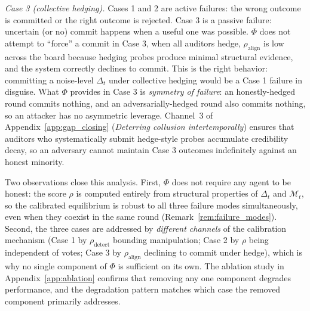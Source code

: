 \emph{Case 3 (collective hedging).} Cases 1 and 2 are active failures: the wrong outcome is committed or the right outcome is rejected. Case 3 is a passive failure: uncertain (or no) commit happens when a useful one was possible. $\Phi$ does not attempt to ``force'' a commit in Case 3, when all auditors hedge, $\rho_{\mathrm{align}}$ is low across the board because hedging probes produce minimal structural evidence, and the system correctly declines to commit. This is the right behavior: committing a noise-level $\Delta_t$ under collective hedging would be a Case 1 failure in disguise. What $\Phi$ provides in Case 3 is \emph{symmetry of failure}: an honestly-hedged round commits nothing, and an adversarially-hedged round also commits nothing, so an attacker has no asymmetric leverage. Channel~3 of Appendix~\ref{app:gap_closing} (\emph{Deterring collusion intertemporally}) ensures that auditors who systematically submit hedge-style probes accumulate credibility decay, so an adversary cannot maintain Case 3 outcomes indefinitely against an honest minority.

Two observations close this analysis. First, $\Phi$ does not require any agent to be honest: the score $\rho$ is computed entirely from structural properties of $\Delta_t$ and $\mathcal{M}_t$, so the calibrated equilibrium is robust to all three failure modes simultaneously, even when they coexist in the same round (Remark~\ref{rem:failure_modes}). Second, the three cases are addressed by \emph{different channels} of the calibration mechanism (Case 1 by $\rho_{\mathrm{detect}}$ bounding manipulation; Case 2 by $\rho$ being independent of votes; Case 3 by $\rho_{\mathrm{align}}$ declining to commit under hedge), which is why no single component of $\Phi$ is sufficient on its own. The ablation study in Appendix~\ref{app:ablation} confirms that removing any one component degrades performance, and the degradation pattern matches which case the removed component primarily addresses.